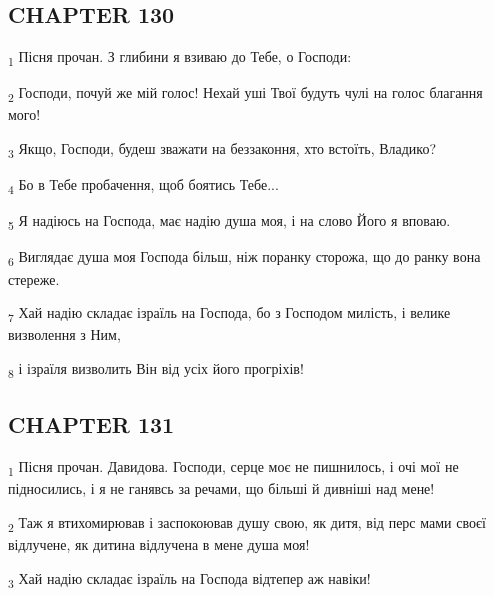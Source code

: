 \subsection{CHAPTER 130}
\begin{tcolorbox}
\textsubscript{1} Пісня прочан. З глибини я взиваю до Тебе, о Господи:
\end{tcolorbox}
\begin{tcolorbox}
\textsubscript{2} Господи, почуй же мій голос! Нехай уші Твої будуть чулі на голос благання мого!
\end{tcolorbox}
\begin{tcolorbox}
\textsubscript{3} Якщо, Господи, будеш зважати на беззаконня, хто встоїть, Владико?
\end{tcolorbox}
\begin{tcolorbox}
\textsubscript{4} Бо в Тебе пробачення, щоб боятись Тебе...
\end{tcolorbox}
\begin{tcolorbox}
\textsubscript{5} Я надіюсь на Господа, має надію душа моя, і на слово Його я вповаю.
\end{tcolorbox}
\begin{tcolorbox}
\textsubscript{6} Виглядає душа моя Господа більш, ніж поранку сторожа, що до ранку вона стереже.
\end{tcolorbox}
\begin{tcolorbox}
\textsubscript{7} Хай надію складає ізраїль на Господа, бо з Господом милість, і велике визволення з Ним,
\end{tcolorbox}
\begin{tcolorbox}
\textsubscript{8} і ізраїля визволить Він від усіх його прогріхів!
\end{tcolorbox}
\subsection{CHAPTER 131}
\begin{tcolorbox}
\textsubscript{1} Пісня прочан. Давидова. Господи, серце моє не пишнилось, і очі мої не підносились, і я не ганявсь за речами, що більші й дивніші над мене!
\end{tcolorbox}
\begin{tcolorbox}
\textsubscript{2} Таж я втихомирював і заспокоював душу свою, як дитя, від перс мами своєї відлучене, як дитина відлучена в мене душа моя!
\end{tcolorbox}
\begin{tcolorbox}
\textsubscript{3} Хай надію складає ізраїль на Господа відтепер аж навіки!
\end{tcolorbox}
